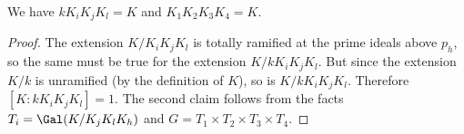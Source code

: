 \begin{lemma}\label{comp}
We have $kK_iK_jK_l=K$ and $K_1K_2K_3K_4=K$.
\end{lemma}
\begin{proof}
The extension $K/K_iK_jK_l$ is totally ramified at the prime ideals above $p_h$, so the same must be true for the extension $K/kK_iK_jK_l$. But since the extension $K/k$ is unramified (by the definition of $K$), so is $K/kK_iK_jK_l$. Therefore $[K:kK_iK_jK_l]=1$. The second claim follows from the facts %
$T_i=\Gal(K/K_jK_lK_h)$ and $G=T_1\times T_2\times T_3\times T_4$.
\end{proof}
\begin{center}
\end{center}

